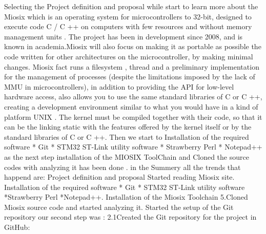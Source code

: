 \documentclass[11pt]{article}
\begin{document}
Selecting the Project definition and proposal while start to learn more about the Miosix which is an operating system for microcontrollers to 32-bit, designed to execute code C / C ++ on computers with few resources and without memory management units . The project has been in development since 2008, and is known in academia.Miosix will also focus on making it as portable as possible the code written for other architectures on the microcontroller, by making minimal changes. Miosix fact runs a filesystem , thread and a preliminary implementation for the management of processes (despite the limitations imposed by the lack of MMU in microcontrollers), in addition to providing the API for low-level hardware access, also allows you to use the same standard libraries of C or C ++, creating a development environment similar to what you would have in a kind of platform UNIX .
The kernel must be compiled together with their code, so that it can be the linking static with the features offered by the kernel itself or by the standard libraries of C or C ++. Then we start to    Installation of the required software\newline
* Git \newline
* STM32 ST-Link utility software\newline
* Strawberry Perl \newline
* Notepad++ \newline
as the next step installation of the MIOSIX ToolChain and Cloned the source codes with analyzing it has been done .
in the Summery all the trends that happend are: Project definition and proposal Started reading Miosix site. Installation of the required software\newline
 * Git\newline
 * STM32 ST-Link utility software\newline
 *Strawberry Perl\newline
 *Notepad++. Installation of the Miosix Toolchain\newline
 5.Cloned Miosix source code and started analyzing it. Started the setup of the Git repository\newline
our second step was :\newline
 2.1Created the Git repository for the project in GitHub:\newline
\end{document}
